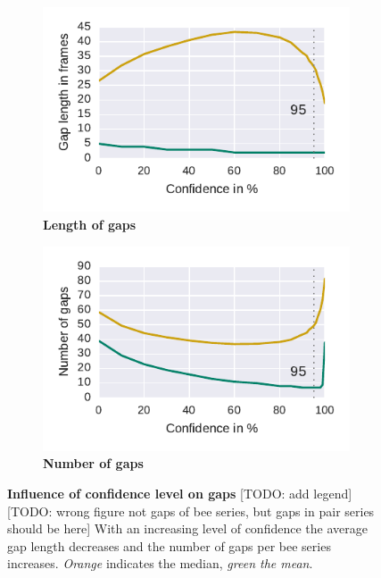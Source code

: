 \begin{figure}[htb]
	\centering
	\begin{subfigure}[b]{0.45\textwidth}
		\includegraphics[width=\textwidth]{Figures/gaplen}
		\caption[Length of gaps]{\textbf{Length of gaps}}
		\label{fig:gaplen}
	\end{subfigure}
	\begin{subfigure}[b]{0.45\textwidth}
		\includegraphics[width=\textwidth]{Figures/numgaps}
		\caption[Number of gaps]{\textbf{Number of gaps}}
		\label{fig:numgaps}
	\end{subfigure}
	\caption[Influence of Confidence Level on Gaps]{\textbf{Influence of confidence level on gaps} [TODO: add legend][TODO: wrong figure not gaps of bee series, but gaps in pair series should be here] With an increasing level of confidence the average gap length decreases and the number of gaps per bee series increases. \emph{Orange} indicates the median, \emph{green the mean}.\protect\footnotemark }
	\label{fig:gaps}
\end{figure}

